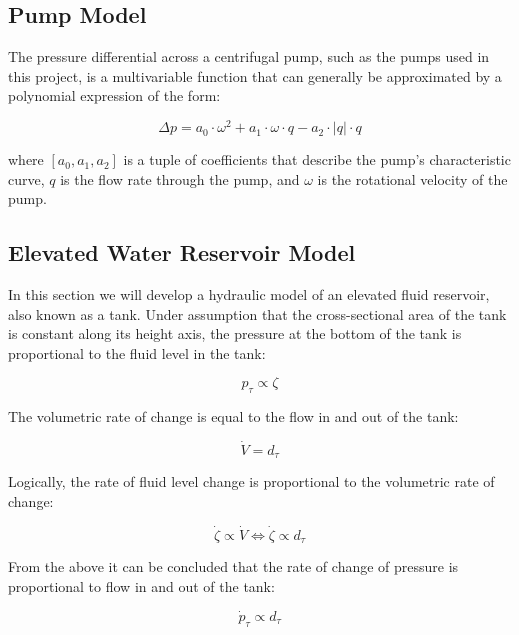 \subsection{Pump Model}\label{subsec:PumpModel}

The pressure differential across a centrifugal pump, such as the pumps used in this project, is a multivariable function that can generally be approximated by a polynomial expression of the form:

\begin{equation}\label{eq:PumpPressure}
	\Delta p =   a_0\cdot \omega^2 +  a_1\cdot \omega \cdot q -a_2\cdot |q|\cdot q
\end{equation}

where $[a_0,a_1,a_2]$ is a tuple of coefficients that describe the pump's characteristic curve, $q$ is the flow rate through the pump, and $\omega$ is the rotational velocity of the pump.

\subsection{Elevated Water Reservoir Model}

In this section we will develop a hydraulic model of an elevated fluid reservoir, also known as a tank.
Under assumption that the cross-sectional area of the tank is constant along its height axis, the pressure at the bottom of the tank is proportional to the fluid level in the tank:

\begin{equation} \label{eq:p prop zeta}
	p_\tau \propto \zeta
\end{equation}

The volumetric rate of change is equal to the flow in and out of the tank:

\begin{equation} \label{eq:vdot = dt}
	\dot{V} = d_\tau
\end{equation}

Logically, the rate of fluid level change is proportional to the volumetric rate of change:  
 
 \begin{equation} \label{eq:zeta prop dt}
	\dot{\zeta} \propto \dot{V} \Leftrightarrow \dot{\zeta} \propto d_\tau
\end{equation} 

From the above it can be concluded that the rate of change of pressure is proportional to flow in and out of the tank:

\begin{equation} \label{eq:dotp prop dt}
	\dot{p}_{\tau} \propto d_\tau 
\end{equation}

